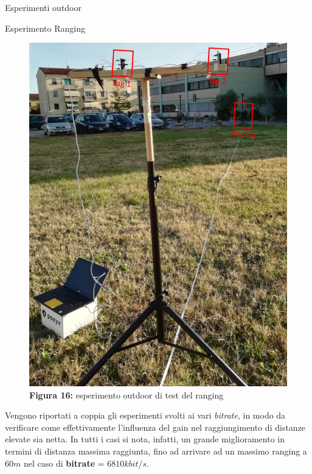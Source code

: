 \documentclass[12pt]{report}
\begin{document}
\begin{section}{Esperimenti outdoor}
\begin{subsection}{Esperimento Ranging}
			\begin{figure}[H]
				\centering
				\includegraphics[scale=0.35]{EspOutRan}
	 			\caption{\textbf{Figura 16:} esperimento outdoor di test del ranging\label{EspOutRan}}
			\end{figure}
			Vengono riportati a coppia gli esperimenti svolti ai vari \textit{bitrate}, in modo da verificare come effettivamente l'influenza del gain nel raggiungimento di distanze elevate sia netta. In tutti i casi si nota, infatti, un grande miglioramento in termini di distanza massima raggiunta, fino ad arrivare ad un massimo 					ranging a $60m$ nel caso di \textbf{bitrate}  = $6810kbit/s$. 


\end{subsection}
\end{section}
\end{document}
